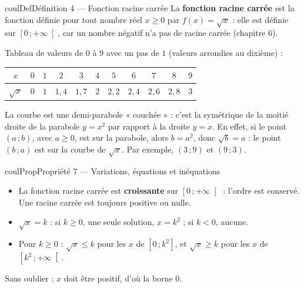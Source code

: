 \documentclass[11pt,a4paper]{article}
\makeatletter
\renewcommand{\le}{\leqslant}
\renewcommand{\ge}{\geqslant}
\newcommand{\lycee@repere}[4]{%
  \draw[grille,step=1] (#1,#2) grid (#3,#4);
  \draw[-{Stealth[length=2mm]},thick] (#1,0)--({#3+0.4},0) node[below left=-1pt]{$x$};
  \draw[-{Stealth[length=2mm]},thick] (0,#2)--(0,{#4+0.4}) node[below left=-1pt]{$y$};
  \node[below left,font=\scriptsize,inner sep=1.5pt] at (0,0) {$0$};}
\newcommand{\lycee@gradx}[1]{\foreach \k/\l in {#1}{%
  \draw (\k,0.07)--(\k,-0.07) node[below,font=\scriptsize,inner sep=1.5pt]{$\l$};}}
\newcommand{\lycee@grady}[1]{\foreach \k/\l in {#1}{%
  \draw (0.07,\k)--(-0.07,\k) node[left,font=\scriptsize,inner sep=1.5pt]{$\l$};}}
\newcommand{\lycee@intff}[2]{\left[#1\,;#2\right]}
\newcommand{\lycee@intfo}[2]{\left[#1\,;#2\right[}
\providecommand{\repere}{\lycee@repere}%
\providecommand{\gradx}{\lycee@gradx}%
\providecommand{\grady}{\lycee@grady}%
\providecommand{\intff}{\lycee@intff}%
\providecommand{\intfo}{\lycee@intfo}%
\newcounter{lycee@signet}
\newcommand{\signet}[3][]{\stepcounter{lycee@signet}%
  \edef\lycee@dest{\if\relax\detokenize{#1}\relax
    signet.\arabic{lycee@signet}\else#1\fi}%
  \hypertarget{\lycee@dest}{}\bookmark[level=#2,dest=\lycee@dest]{#3}}
\newenvironment{definitionbox}[1][Définition]%
  {\begin{boitecours}[phantom={\signet{2}{#1}}]{coulDef}{#1}}{\end{boitecours}}
\newenvironment{proprietebox}[1][Propriété]%
  {\begin{boitecours}[phantom={\signet{2}{#1}}]{coulProp}{#1}}{\end{boitecours}}
\makeatother
\begin{document}
\begin{definitionbox}[Définition 4 --- Fonction racine carrée]
La \textbf{fonction racine carrée} est la fonction définie pour tout nombre réel $x\ge 0$
par ${f(x)=\sqrt{x}}$ : elle est définie sur $\intfo{0}{+\infty}$, car un nombre négatif n'a
pas de racine carrée (chapitre 6).

\smallskip
\begin{minipage}[c]{0.62\linewidth}\raggedright
Tableau de valeurs de $0$ à $9$ avec un pas de $1$ (valeurs arrondies au dixième) :
\begin{center}
\renewcommand{\arraystretch}{1.25}\setlength{\tabcolsep}{3.5pt}
\begin{tabular}{|c|*{10}{c|}}
\hline
$x$ & $0$ & $1$ & $2$ & $3$ & $4$ & $5$ & $6$ & $7$ & $8$ & $9$\\\hline
$\sqrt{x}$ & $0$ & $1$ & $1{,}4$ & $1{,}7$ & $2$ & $2{,}2$ & $2{,}4$ & $2{,}6$ & $2{,}8$
  & $3$\\\hline
\end{tabular}
\end{center}
La courbe est une demi-parabole « couchée » : c'est la symétrique de la moitié droite
de la parabole $y=x^{2}$ par rapport à la droite $y=x$. En effet, si le point $(a\,;b)$,
avec $a\ge 0$, est sur la parabole, alors $b=a^{2}$, donc $\sqrt{b}=a$ : le point
$(b\,;a)$ est sur la courbe de $\sqrt{x}$. Par exemple, $(3\,;9)$ et $(9\,;3)$.
\end{minipage}\hfill
\begin{minipage}[c]{0.34\linewidth}\centering
{}
\end{minipage}
\end{definitionbox}

\begin{proprietebox}[Propriété 7 --- Variations, équations et inéquations]
\begin{itemize}
  \item La fonction racine carrée est \textbf{croissante} sur $\intfo{0}{+\infty}$ : l'ordre
        est conservé. Une racine carrée est toujours positive ou nulle.
  \item $\sqrt{x}=k$ : si $k\ge 0$, une seule solution, $x=k^{2}$ ; si $k<0$, aucune.
  \item Pour $k\ge 0$ : $\sqrt{x}\le k$ pour les $x$ de $\intff{0}{k^{2}}$, et $\sqrt{x}\ge k$
        pour les $x$ de $\intfo{k^{2}}{+\infty}$.
\end{itemize}
Sans oublier : $x$ doit être positif, d'où la borne $0$.
\end{proprietebox}
\end{document}
